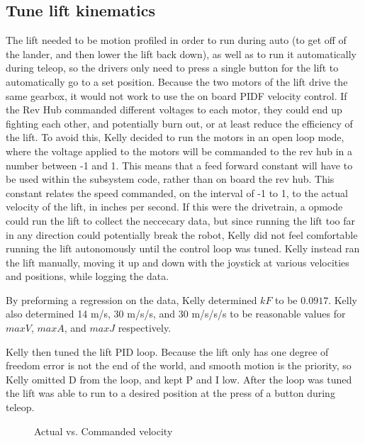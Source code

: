 \documentclass{article}
\begin{document}
\subsection{Tune lift kinematics}
The lift needed to be motion profiled in order to run during auto (to get off of the lander, and then lower the lift back down), as well as to run it automatically during teleop, so the drivers only need to press a single button for the lift to automatically go to a set position. Because the two motors of the lift drive the same gearbox, it would not work to use the on board PIDF velocity control. If the Rev Hub commanded different voltages to each motor, they could end up fighting each other, and potentially burn out, or at least reduce the efficiency of the lift. To avoid this, Kelly decided to run the motors in an open loop mode, where the voltage applied to the motors will be commanded to the rev hub in a number between -1 and 1. This means that a feed forward constant will have to be used within the subsystem code, rather than on board the rev hub. This constant relates the speed commanded, on the interval of -1 to 1, to the actual velocity of the lift, in inches per second. If this were the drivetrain, a opmode could run the lift to collect the neccecary data, but since running the lift too far in any direction could potentially break the robot, Kelly did not feel comfortable running the lift autonomously until the control loop was tuned. Kelly instead ran the lift manually, moving it up and down with the joystick at various velocities and positions, while logging the data. 

By preforming a regression on the data, Kelly determined $kF$ to be $0.0917$. Kelly also determined 14 m/s, 30 m/s/s, and 30 m/s/s/s to be reasonable values for $maxV$, $maxA$, and $maxJ$ respectively.

Kelly then tuned the lift PID loop. Because the lift only has one degree of freedom error is not the end of the world, and smooth motion is the priority, so Kelly omitted D from the loop, and kept P and I low. After the loop was tuned the lift was able to run to a desired position at the press of a button during teleop.

\begin {figure}
\centering
{}
\caption {Actual vs. Commanded velocity}
\label {fig:graph}
\end{figure}
\end{document}
